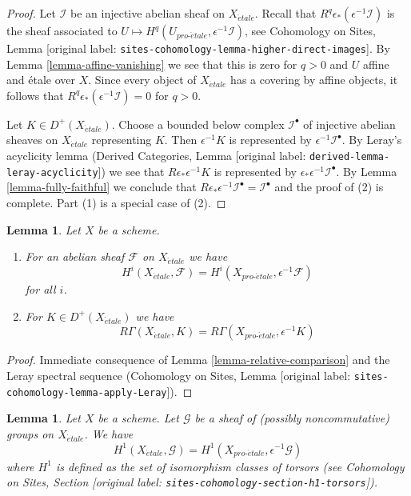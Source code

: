\documentclass[10pt,a4paper]{article}
\theoremstyle{plain}
\newtheorem{lemma}[subsection]{Lemma}
\theoremstyle{definition}
\theoremstyle{remark}
\numberwithin{equation}{subsection}
\def\proetale{{pro\text{-}\acute{e}tale}}
\def\etale{{\acute{e}tale}}
\begin{document}
\begin{proof}
Let $\mathcal{I}$ be an injective abelian sheaf on $X_\etale$.
Recall that $R^q\epsilon_*(\epsilon^{-1}\mathcal{I})$ is the sheaf associated
to $U \mapsto H^q(U_\proetale, \epsilon^{-1}\mathcal{I})$, see
Cohomology on Sites, Lemma \textnormal{[original label: \nolinkurl{sites-cohomology-lemma-higher-direct-images}]}.
By Lemma \ref{lemma-affine-vanishing} we see that this is zero for $q > 0$
and $U$ affine and \'etale over $X$. Since every object of
$X_\etale$ has a covering by affine objects, it follows that
$R^q\epsilon_*(\epsilon^{-1}\mathcal{I}) = 0$ for $q > 0$.

\medskip\noindent
Let $K \in D^+(X_\etale)$. Choose a bounded below complex $\mathcal{I}^\bullet$
of injective abelian sheaves on $X_\etale$ representing $K$.
Then $\epsilon^{-1}K$ is represented by $\epsilon^{-1}\mathcal{I}^\bullet$.
By Leray's acyclicity lemma (Derived Categories, Lemma
\textnormal{[original label: \nolinkurl{derived-lemma-leray-acyclicity}]}) we see that $R\epsilon_*\epsilon^{-1}K$
is represented by $\epsilon_*\epsilon^{-1}\mathcal{I}^\bullet$.
By Lemma \ref{lemma-fully-faithful} we conclude that
$R\epsilon_*\epsilon^{-1}\mathcal{I}^\bullet = \mathcal{I}^\bullet$
and the proof of (2) is complete. Part (1) is a special case of (2).
\end{proof}

\begin{lemma}
\label{lemma-compare-cohomology}
Let $X$ be a scheme.
\begin{enumerate}
\item For an abelian sheaf $\mathcal{F}$ on $X_\etale$ we have
$$
H^i(X_\etale, \mathcal{F}) =
H^i(X_\proetale, \epsilon^{-1}\mathcal{F})
$$
for all $i$.
\item For $K \in D^+(X_\etale)$ we have
$$
R\Gamma(X_\etale, K) = R\Gamma(X_\proetale, \epsilon^{-1}K)
$$
\end{enumerate}
\end{lemma}

\begin{proof}
Immediate consequence of Lemma \ref{lemma-relative-comparison} and
the Leray spectral sequence (Cohomology on Sites, Lemma
\textnormal{[original label: \nolinkurl{sites-cohomology-lemma-apply-Leray}]}).
\end{proof}

\begin{lemma}
\label{lemma-compare-cohomology-nonabelian}
Let $X$ be a scheme. Let $\mathcal{G}$ be a sheaf of (possibly
noncommutative) groups on $X_\etale$. We have
$$
H^1(X_\etale, \mathcal{G}) =
H^1(X_\proetale, \epsilon^{-1}\mathcal{G})
$$
where $H^1$ is defined as the set of isomorphism classes of
torsors (see
Cohomology on Sites, Section \textnormal{[original label: \nolinkurl{sites-cohomology-section-h1-torsors}]}).
\end{lemma}
\end{document}
